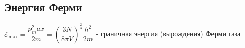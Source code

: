 \begin{multicols*}{2}
		\section{Энергия Ферми}
		${\mathcal{E}}_{\text{max}} = \dfrac{p^2_max}{2m} = \left(\dfrac{3N}{8\pi V}\right)^{\frac{2}{3}}\dfrac{h^2}{2m}$ - граничная энергия (вырождения) Ферми газа
	\end{multicols*}

